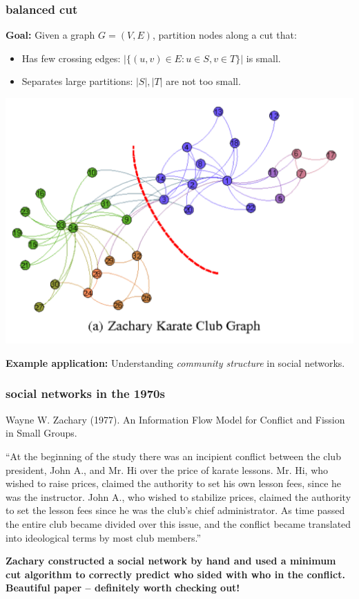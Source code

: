 \documentclass[compress]{beamer}
\begin{document}
\begin{frame}
	\frametitle{balanced cut}
	\textbf{Goal:} Given a graph $G = (V,E)$, partition nodes along a cut that:
	\begin{itemize}
		\item Has few crossing edges: $|\{(u,v) \in E: u\in S,v\in T \}|$ is small.
		\item Separates large partitions: $|S|,|T|$ are not too small.
	\end{itemize}
\vspace{-.5em}
	\begin{center}
		\includegraphics[width=.55\textwidth]{karate.png}
		\vspace{-1em}
	\end{center}
	\textbf{Example application:} Understanding \emph{community structure} in social networks. 
\end{frame}

\begin{frame}
	\frametitle{social networks in the 1970s}
	\begin{center}
	Wayne W. Zachary (1977). An Information Flow Model for Conflict and Fission in Small Groups.
	\end{center}
	
	\small{
	``At the beginning of the study there was an incipient conflict
	between the club president, John A., and Mr. Hi over the price of
	karate lessons. Mr. Hi, who wished to raise prices, claimed the authority
	to set his own lesson fees, since he was the instructor. John A., who
	wished to stabilize prices, claimed the authority to set the lesson fees
	since he was the club's chief administrator.
	As time passed the entire club became divided over this issue, and
	the conflict became translated into ideological terms by most club
	members.''
}
	
	\begin{center}
		\textbf{Zachary constructed a social network by hand and used a minimum cut algorithm to correctly predict who sided with who in the conflict. 
		\alert{Beautiful paper -- definitely worth checking out!}}
	\end{center}
\end{frame}
\end{document}
